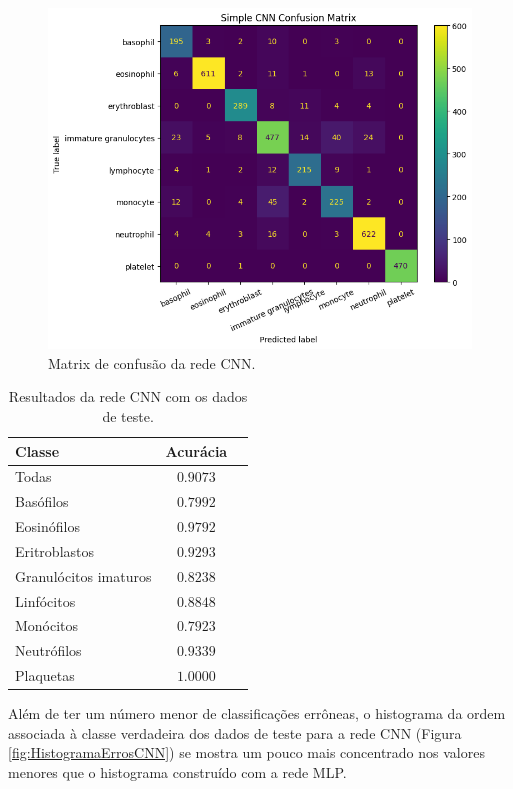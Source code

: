 \documentclass[final,5p]{elsarticle}
\numberwithin{equation}{section}
\begin{document}
    \begin{figure}[hbt!]
        \includegraphics[width=0.95\columnwidth]{CNN_Simple_cm.png}
        \caption{Matrix de confusão da rede CNN.}\label{fig:MatrizConfusaoCNN}
    \end{figure}

    \begin{table}[h]
        \centering
        \begin{tabular}{l c c}
            \toprule
            \textbf{Classe} & \textbf{Acurácia} \\
            \midrule
            Todas & $0.9073$ \\
            \addlinespace
            Basófilos  & $0.7992$ \\
            Eosinófilos  & $0.9792$ \\
            Eritroblastos  & $0.9293$ \\
            Granulócitos imaturos  & $0.8238$ \\
            Linfócitos  & $0.8848$ \\
            Monócitos  & $0.7923$ \\
            Neutrófilos  & $0.9339$ \\
            Plaquetas  & $1.0000$ \\
            \bottomrule
        \end{tabular}
        \caption{Resultados da rede CNN com os dados de teste.}\label{tab:ResultadosCNN}
    \end{table}

    Além de ter um número menor de classificações errôneas, o histograma da ordem associada à classe verdadeira dos dados de teste para a rede CNN (Figura \ref{fig:HistogramaErrosCNN}) se mostra um pouco mais concentrado nos valores menores que o histograma construído com a rede MLP.
\end{document}
